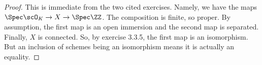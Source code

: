 \begin{proof}
	This is immediate from the two cited exercises. Namely, we have the maps $\Spec\scO_K \to X \to \Spec\ZZ$. The composition is finite, so proper. By assumption, the first map is an open immersion and the second map is separated. Finally, $X$ is connected. So, by exercise 3.3.5, the first map is an isomorphism. But an inclusion of schemes being an isomorphism means it is actually an equality.
\end{proof}
